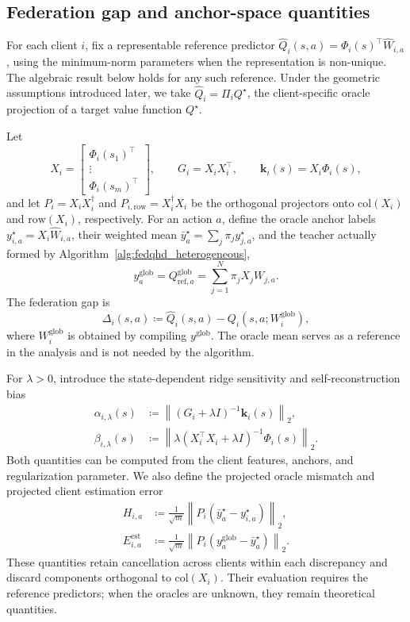 \documentclass[sigconf,anonymous]{aamas}
\theoremstyle{plain}
\theoremstyle{definition}
\theoremstyle{remark}
\newcommand{\defeq}{\coloneqq}
\begin{document}
\subsection{Federation gap and anchor-space quantities}
\label{subsec:fed_gap}

For each client $i$, fix a representable reference predictor
$\hat Q_i(s,a)=\Phi_i(s)^\top\hat W_{i,a}$, using the minimum-norm
parameters when the representation is non-unique.  The algebraic result
below holds for any such reference.  Under the geometric assumptions
introduced later, we take $\hat Q_i=\Pi_iQ^\star$, the client-specific
oracle projection of a target value function $Q^\star$.

Let
\[
X_i=\begin{bmatrix}
\Phi_i(s_1)^\top\\[-1mm]\vdots\\[-1mm]\Phi_i(s_m)^\top
\end{bmatrix},\qquad
G_i=X_iX_i^\top,\qquad
\mathbf k_i(s)=X_i\Phi_i(s),
\]
and let $P_i=X_iX_i^\dagger$ and
$P_{i,\mathrm{row}}=X_i^\dagger X_i$ be the orthogonal projectors onto
$\mathrm{col}(X_i)$ and $\mathrm{row}(X_i)$, respectively.  For an action
$a$, define the oracle anchor labels
$y^\star_{i,a}=X_i\hat W_{i,a}$, their weighted mean
$\bar y^\star_a=\sum_j\pi_j y^\star_{j,a}$, and the teacher actually
formed by Algorithm~\ref{alg:fedqhd_heterogeneous},
\[
y^{\mathrm{glob}}_a
=Q^{\mathrm{glob}}_{\mathrm{ref},a}
=\sum_{j=1}^N\pi_jX_jW_{j,a}.
\]
The federation gap is
\begin{equation}
\Delta_i(s,a)
\defeq
\hat Q_i(s,a)-Q_i(s,a;W_i^{\mathrm{glob}}),
\label{eq:gap_def}
\end{equation}
where $W_i^{\mathrm{glob}}$ is obtained by compiling
$y^{\mathrm{glob}}$.  The oracle mean serves as a reference in the
analysis and is not needed by the algorithm.

For $\lambda>0$, introduce the state-dependent ridge sensitivity and
self-reconstruction bias
\begin{align}
\alpha_{i,\lambda}(s)
&\defeq
\left\|(G_i+\lambda I)^{-1}\mathbf k_i(s)\right\|_2,
\label{eq:alpha_def}\\
\beta_{i,\lambda}(s)
&\defeq
\left\|\lambda(X_i^\top X_i+\lambda I)^{-1}\Phi_i(s)\right\|_2.
\label{eq:beta_def}
\end{align}
Both quantities can be computed from the client features, anchors, and
regularization parameter.  We also define the projected oracle
mismatch and projected client estimation error
\begin{align}
H_{i,a}
&\defeq
\frac{1}{\sqrt m}
\left\|P_i(\bar y^\star_a-y^\star_{i,a})\right\|_2,
\label{eq:H_def}\\
E_{i,a}^{\mathrm{est}}
&\defeq
\frac{1}{\sqrt m}
\left\|P_i(y^{\mathrm{glob}}_a-\bar y^\star_a)\right\|_2.
\label{eq:E_def}
\end{align}
These quantities retain cancellation across clients within each
discrepancy and discard components orthogonal to $\mathrm{col}(X_i)$.
Their evaluation requires the reference predictors; when the oracles
are unknown, they remain theoretical quantities.
\end{document}
